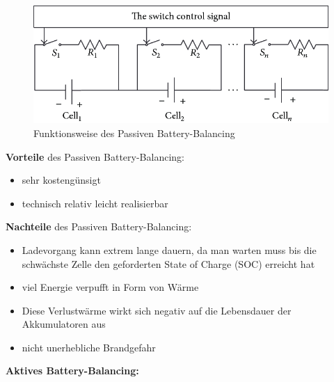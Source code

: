 \begin{figure}[H]
	\begin{center}
		\includegraphics[scale=0.5]{figures/Akku/Passive-cell-balancing.png}
		\caption{Funktionsweise des Passiven Battery-Balancing}
	\end{center}
\end{figure}

\textbf{Vorteile} des Passiven Battery-Balancing:
\begin{itemize}
\item {sehr kostengünsigt} \medskip\\
\item {technisch relativ leicht realisierbar} \medskip\\
\end{itemize}

\textbf{Nachteile} des Passiven Battery-Balancing:
\begin{itemize}
\item {Ladevorgang kann extrem lange dauern, da man warten muss bis die schwächste Zelle den geforderten State of Charge (SOC) erreicht hat} \medskip\\
\item {viel Energie verpufft in Form von Wärme} \medskip\\
\item {Diese Verlustwärme wirkt sich negativ auf die Lebensdauer der Akkumulatoren aus} \medskip\\
\item {nicht unerhebliche Brandgefahr} \medskip\\
\end{itemize}
\newpage

\textbf{Aktives Battery-Balancing:}

